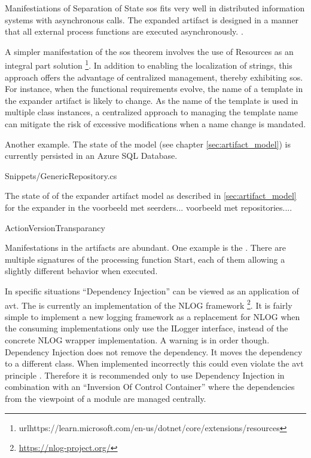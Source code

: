 Manifestiations of Separation of State
\gls{sos} fits very well in distributed information systems with asynchronous calls. The
expanded artifact is designed in a manner that all external process functions are executed
asynchronously. .

A simpler manifestation of the \gls{sos} theorem involves the use of Resources as an
integral part solution
\footnote{url{https://learn.microsoft.com/en-us/dotnet/core/extensions/resources}}. In
addition to enabling the localization of strings, this approach offers the advantage of
centralized management, thereby exhibiting \gls{sos}. For instance, when the functional
requirements evolve, the name of a template in the expander artifact is likely to change.
As the name of the template is used in multiple class instances, a centralized approach to
managing the template name can mitigate the risk of excessive modifications when a name
change is mandated.

Another example. The state of the model (see chapter \ref{sec:artifact_model}) is
currently persisted in an Azure SQL Database.


    {Snippets/GenericRepository.cs}

The state of of the expander artifact model as described in \ref{sec:artifact_model} for the expander in the 
voorbeeld met seerders...
voorbeeld met repositories....



ActionVersionTransparancy

Manifestations in the artifacts are abundant. One example is the
 \parencite{koks_icommandlineinteractor_2023}.
There are multiple signatures of the processing function Start, each of them allowing a
slightly different behavior when executed.

In specific situations \enquote{Dependency Injection} can be viewed as an application of
\gls{avt}. The  \parencite{koks_logger_2023} is currently an
implementation of the NLOG framework \footnote{\url{https://nlog-project.org/}}. It is
fairly simple to implement a new logging framework as a replacement for NLOG when the
consuming implementations only use the ILogger interface, instead of the concrete NLOG
wrapper implementation. A warning is in order though. Dependency Injection does not remove
the dependency. It moves the dependency to a different class. When implemented incorrectly
this could even violate the \gls{avt} principle \parencite[213]{mannaert_normalized_2016}.
Therefore it is recommended only to use Dependency Injection in combination with an
\enquote{Inversion Of Control Container} where the dependencies from the viewpoint of a
module are managed centrally.


